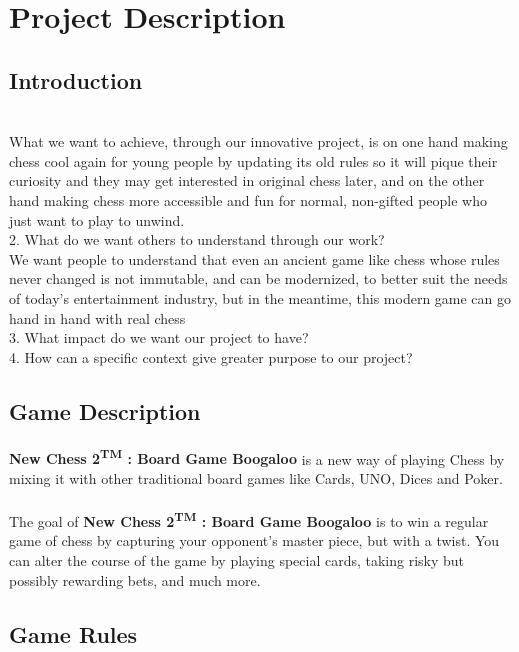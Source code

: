 \documentclass[12pt]{article}
\begin{document}
    \section{Project Description}
        \subsection{Introduction}
            \\What we want to achieve, through our innovative project, is on one hand making chess cool again for young people by updating its old rules so it will pique their curiosity and they may get interested in original chess later, and on the other hand making chess more accessible and fun for normal, non-gifted people who just want to play to unwind.
            \\2. What do we want others to understand through our work?
            \\We want people to understand that even an ancient game like chess whose rules never changed is not immutable, and can be modernized, to better suit the needs of today's entertainment industry, but in the meantime, this modern game can go hand in hand with real chess
            \\3. What impact do we want our project to have?
            \\4. How can a specific context give greater purpose to our project?

        \subsection{Game Description}
            \paragraph{}
                \textbf{New Chess 2\textsuperscript{TM} : Board Game Boogaloo} is a new way of playing Chess by mixing it with other traditional board games like Cards, UNO, Dices and Poker.
            \paragraph{}
                The goal of \textbf{New Chess 2\textsuperscript{TM} : Board Game Boogaloo} is to win a regular game of chess by capturing your opponent's master piece, but with a twist. You can alter the course of the game by playing special cards, taking risky but possibly rewarding bets, and much more.
        \subsection{Game Rules}
\end{document}
